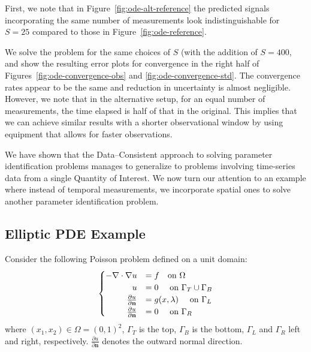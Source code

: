 First, we note that in Figure~\ref{fig:ode-alt-reference} the predicted signals incorporating the same number of measurements look indistinguishable for $S=25$ compared to those in Figure~\ref{fig:ode-reference}.



We solve the problem for the same choices of $S$ (with the addition of $S=400$, and show the resulting error plots for convergence in the right half of Figures~\ref{fig:ode-convergence-obs} and \ref{fig:ode-convergence-std}.
The convergence rates appear to be the same and reduction in uncertainty is almost negligible.
However, we note that in the alternative setup, for an equal number of measurements, the time elapsed is half of that in the original.
This implies that we can achieve similar results with a shorter observational window by using equipment that allows for faster observations.

We have shown that the Data--Consistent approach to solving parameter identification problems manages to generalize to problems involving time-series data from a single Quantity of Interest.
We now turn our attention to an example where instead of temporal measurements, we incorporate spatial ones to solve another parameter identification problem.


\subsection{Elliptic PDE Example}\label{subsec:pde-example}

Consider the following Poisson problem defined on a unit domain:
\begin{equation}\label{eq:pde-equation}
\begin{cases}
\hfill -\nabla \cdot \nabla u &= f \quad\text{on } \Omega \\
\hfill u &= 0 \quad\text{ on } \Gamma_T \cup \Gamma_B \\
\hfill \frac{\partial u}{\partial \mathbf{n}} &= g(x,\param) \quad\text{ on } \Gamma_L \\
\hfill \frac{\partial u}{\partial \mathbf{n}} &= 0 \quad\text{ on } \Gamma_R
\end{cases}
\end{equation}
where $(x_1, x_2) \in \Omega = (0,1)^2$, $\Gamma_T$ is the top, $\Gamma_B$ is the bottom, $\Gamma_L$ and $\Gamma_R$ left and right, respectively.
$\frac{\partial u}{\partial \mathbf{n}}$ denotes the outward normal direction.

